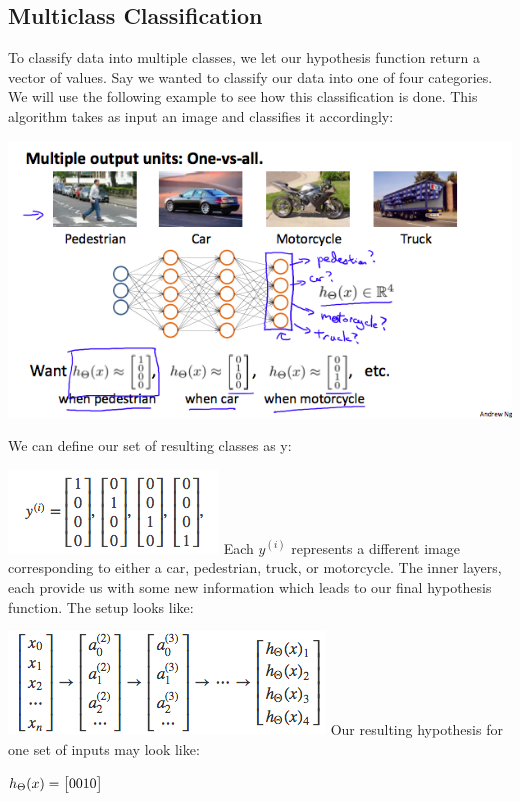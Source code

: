 \documentclass[
]{article}
\begin{document}
\hypertarget{multiclass-classification}{%
\subsection{Multiclass Classification}\label{multiclass-classification}}

To classify data into multiple classes, we let our hypothesis function
return a vector of values. Say we wanted to classify our data into one
of four categories. We will use the following example to see how this
classification is done. This algorithm takes as input an image and
classifies it accordingly:

\includegraphics{Multiclass1.png}

We can define our set of resulting classes as y:

\includegraphics{Multiclass2.png} Each \(y^{(i)}\) represents a
different image corresponding to either a car, pedestrian, truck, or
motorcycle. The inner layers, each provide us with some new information
which leads to our final hypothesis function. The setup looks like:

\includegraphics{Multiclass3.png} Our resulting hypothesis for one set
of inputs may look like:

\(h_\Theta(x) =\begin{bmatrix}0 \newline 0 \newline 1 \newline 0 \newline\end{bmatrix}\)
\end{document}
